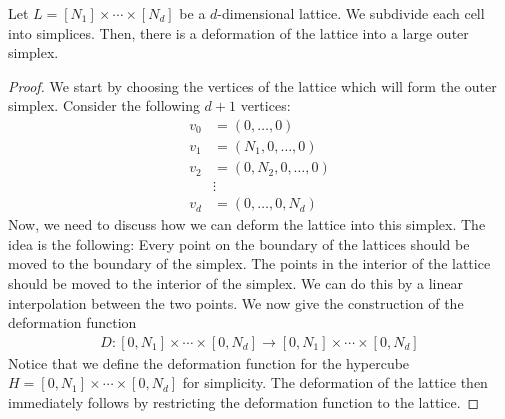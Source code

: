 \begin{lemma}\label{lem:simplicial_deformation}
	Let $L = [N_1] \times \cdots \times [N_d]$ be a $d$-dimensional lattice. We subdivide each cell into simplices. Then, there is a deformation of the lattice into a large outer simplex.
\end{lemma}
\begin{proof}
	We start by choosing the vertices of the lattice which will form the outer simplex. Consider the following $d+1$ vertices:
	\begin{align*}
		v_0 & = (0, \dots, 0)         \\
		v_1 & = (N_1, 0, \dots, 0)    \\
		v_2 & = (0, N_2, 0, \dots, 0) \\
		    & \vdots                  \\
		v_d & = (0, \dots, 0, N_d)
	\end{align*}
	Now, we need to discuss how we can deform the lattice into this simplex. The idea is the following: Every point on the boundary of the lattices should be moved to the boundary of the simplex. The points in the interior of the lattice should be moved to the interior of the simplex. We can do this by a linear interpolation between the two points. We now give the construction of the deformation function
	\begin{align*}
		D : [0, N_1] \times \cdots \times [0, N_d] \rightarrow [0, N_1] \times \cdots \times [0, N_d]
	\end{align*}
	Notice that we define the deformation function for the hypercube $H = [0, N_1] \times \cdots \times [0, N_d]$ for simplicity. The deformation of the lattice then immediately follows by restricting the deformation function to the lattice.


\end{proof}
